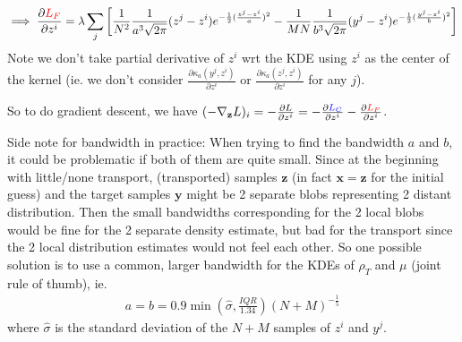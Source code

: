 \documentclass[11pt]{article}
\begin{document}
\begin{enumerate}
\begin{enumerate}
        \begin{align*}
            \implies \frac{\partial \textcolor{red}{L_F}}{\partial z^i}
            = \lambda \sum_j \left[
             \frac{1}{N^2}\frac{1}{a^3\sqrt{2\pi}} (z^j-z^i) e^{-\frac{1}{2}(\frac{z^j-z^i}{a})^2} -  \frac{1}{MN}\frac{1}{b^3\sqrt{2\pi}} (y^j-z^i) e^{-\frac{1}{2}(\frac{y^j-z^i}{b})^2} \right]
        \end{align*}
        Note we don't take partial derivative of $z^i$ wrt the KDE using $z^i$ as the center of the kernel (ie. we don't consider $\frac{\partial \kappa_a(y^j,z^i)}{\partial z^i}$ or $\frac{\partial \kappa_a(z^j,z^i)}{\partial z^i}$ for any $j$).
        \end{enumerate}
    
    So to do gradient descent, we have $(-\nabla_{\mathbf{z}} L)_i =  -\frac{\partial L}{\partial z^i} = -  \frac{\partial \textcolor{blue}{L_C}}{\partial z^i} -  \frac{\partial \textcolor{red}{L_F}}{\partial z^i}$.
    
    Side note for bandwidth in practice: When trying to find the bandwidth $a$ and $b$, it could be problematic if both of them are quite small. Since at the beginning with little/none transport, (transported) samples $\mathbf{z}$ (in fact $\mathbf{x}=\mathbf{z}$ for the initial guess) and the target samples $\mathbf{y}$ might be 2 separate blobs representing 2 distant distribution. Then the small bandwidths corresponding for the 2 local blobs would be fine for the 2 separate density estimate, but bad for the transport since the 2 local distribution estimates would not feel each other. So one possible solution is to use a common, larger bandwidth for the KDEs of $\rho_T$ and $\mu$ (joint rule of thumb), ie. 
    \begin{align*}
        a = b = 0.9 \min (\hat{\sigma}, \frac{IQR}{1.34}) (N+M)^{-\frac{1}{5}}
    \end{align*}
    where $\hat{\sigma}$ is the standard deviation of the $N+M$ samples of $z^i$ and $y^j$.
    
\end{enumerate}
\end{document}
